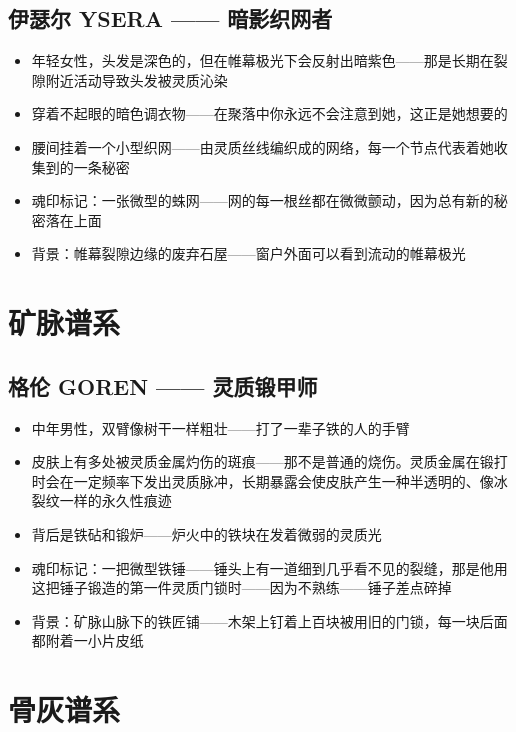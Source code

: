 \documentclass[12pt,a4paper,openany]{ctexbook}
\begin{document}
\subsection{伊瑟尔 YSERA —— 暗影织网者}
\begin{itemize}
    \item 年轻女性，头发是深色的，但在帷幕极光下会反射出暗紫色——那是长期在裂隙附近活动导致头发被灵质沁染
    \item 穿着不起眼的暗色调衣物——在聚落中你永远不会注意到她，这正是她想要的
    \item 腰间挂着一个小型织网——由灵质丝线编织成的网络，每一个节点代表着她收集到的一条秘密
    \item 魂印标记：一张微型的蛛网——网的每一根丝都在微微颤动，因为总有新的秘密落在上面
    \item 背景：帷幕裂隙边缘的废弃石屋——窗户外面可以看到流动的帷幕极光
\end{itemize}

\section{矿脉谱系}

\subsection{格伦 GOREN —— 灵质锻甲师}
\begin{itemize}
    \item 中年男性，双臂像树干一样粗壮——打了一辈子铁的人的手臂
    \item 皮肤上有多处被灵质金属灼伤的斑痕——那不是普通的烧伤。灵质金属在锻打时会在一定频率下发出灵质脉冲，长期暴露会使皮肤产生一种半透明的、像冰裂纹一样的永久性痕迹
    \item 背后是铁砧和锻炉——炉火中的铁块在发着微弱的灵质光
    \item 魂印标记：一把微型铁锤——锤头上有一道细到几乎看不见的裂缝，那是他用这把锤子锻造的第一件灵质门锁时——因为不熟练——锤子差点碎掉
    \item 背景：矿脉山脉下的铁匠铺——木架上钉着上百块被用旧的门锁，每一块后面都附着一小片皮纸
\end{itemize}

\section{骨灰谱系}
\end{document}
